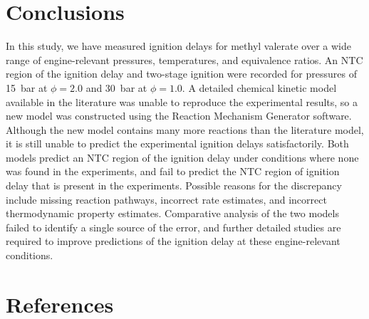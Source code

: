 \documentclass[letterpaper, review]{elsarticle}
\begin{document}
\section{Conclusions}\label{sec:conclusions}

In this study, we have measured ignition delays for methyl valerate over a wide range of
engine-relevant pressures, temperatures, and equivalence ratios. An NTC region of the ignition delay
and two-stage ignition were recorded for pressures of \SI{15}{\bar} at \(\phi=2.0\) and
\SI{30}{\bar} at \(\phi=1.0\). A detailed chemical kinetic model available in the literature was
unable to reproduce the experimental results, so a new model was constructed using the Reaction
Mechanism Generator software. Although the new model contains many more reactions than the
literature model, it is still unable to predict the experimental ignition delays satisfactorily.
Both models predict an NTC region of the ignition delay under conditions where none was found in the
experiments, and fail to predict the NTC region of ignition delay that is present in the
experiments. Possible reasons for the discrepancy include missing reaction pathways, incorrect rate
estimates, and incorrect thermodynamic property estimates. Comparative analysis of the two models
failed to identify a single source of the error, and further detailed studies are required to
improve predictions of the ignition delay at these engine-relevant conditions.

\section*{References}

\end{document}
